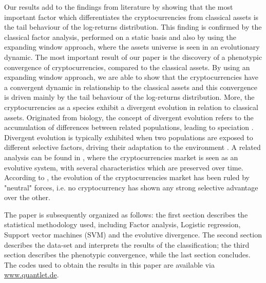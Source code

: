 Our results add to the findings from literature by showing that the most important factor which differentiates the cryptocurrencies from classical assets is the tail behaviour of the log-returns distribution. This finding is confirmed by the classical factor analysis, performed on a static basis and also by using the expanding window approach, where the assets universe is seen in an evolutionary dynamic. The most important result of our paper is the discovery of a phenotypic convergence of cryptocurrencies, compared to the classical assets. By using an expanding window approach, we are able to show that the cryptocurrencies have a convergent dynamic in relationship to the classical assets and this convergence is driven mainly by the tail behaviour of the log-returns distribution. More, the cryptocurrencies as a species exhibit a divergent evolution in relation to classical assets.  Originated from biology, the concept of divergent evolution refers to the accumulation of differences between related populations, leading to speciation \citep{Rieseberg.2004}. Divergent evolution is typically exhibited when two populations are exposed to different selective factors, driving their adaptation to the environment \citep{Bergstrom.2016}. A related analysis can be found in \cite{ElBahrawy.2017}, where the cryptocurrencies market is seen as an evolutive system, with several characteristics which are preserved over time. According to \cite{ElBahrawy.2017}, the evolution of the cryptocurrencies market has been ruled by "neutral" forces, i.e. no cryptocurrency has shown any strong selective advantage over the other.

The paper is subsequently organized as follows: the first section describes the statistical methodology used, including Factor analysis, Logistic regression, Support vector machines (SVM) and the evolutive divergence. The second section describes the data-set and interprets the results of the classification; the third section describes the phenotypic convergence, while the last section concludes. The codes used to obtain the results in this paper are available via \url{www.quantlet.de}. 